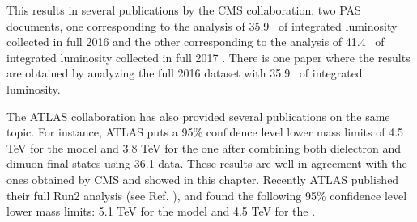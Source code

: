 This results in several publications by the CMS collaboration: two PAS documents, one corresponding to the analysis of 35.9 \fbinv\ of integrated luminosity collected in full 2016 \cite{CMS-PAS-EXO-16-047} and the other corresponding to the analysis of 41.4 \fbinv\ of integrated luminosity collected in full 2017 \cite{CMS-PAS-EXO-18-006}. There is one paper \cite{Sirunyan2018} where the results are obtained by analyzing the full 2016 dataset with 35.9 \fbinv\ of integrated luminosity.

The ATLAS collaboration has also provided several publications on the same topic. For instance, ATLAS \cite{ATLAS-CONF-2017-027} puts a 95\% confidence level lower mass limits of 4.5 TeV for the \ZPSSM model and 3.8 TeV for the \ZPPSI one after combining both dielectron and dimuon final states using 36.1 \fbinv data. These results are well in agreement with the ones obtained by CMS and showed in this chapter. Recently ATLAS published their full Run2 analysis (see Ref. \cite{Aad:2019fac}), and found the following 95\% confidence level lower mass limits: 5.1 TeV for the \ZPSSM model and 4.5 TeV for the \ZPPSI.